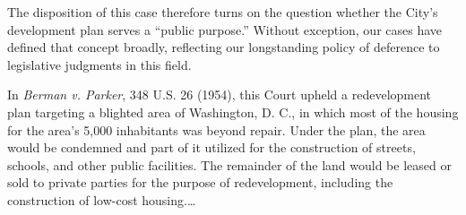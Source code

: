 The disposition of this case therefore turns on the question whether the City's
development plan serves a ``public purpose.'' Without exception, our cases have
defined that concept broadly, reflecting our longstanding policy of deference to
legislative judgments in this field.

In \textit{Berman v. Parker}, 348 U.S. 26 (1954), this Court upheld a
redevelopment plan targeting a blighted area of Washington, D. C., in which most
of the housing for the area's 5,000 inhabitants was beyond repair. Under the
plan, the area would be condemned and part of it utilized for the construction
of streets, schools, and other public facilities. The remainder of the land
would be leased or sold to private parties for the purpose of redevelopment,
including the construction of low-cost housing.\ldots


